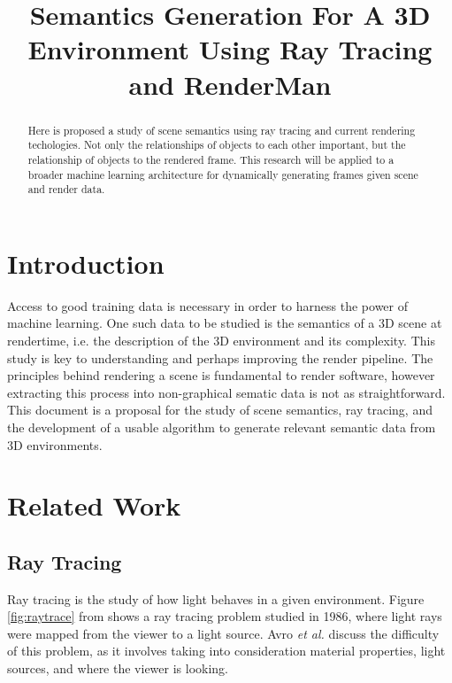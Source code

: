 \documentclass[conference]{IEEEtran}
\begin{document}
\title{Semantics Generation For A 3D Environment Using Ray Tracing and RenderMan}

\author{
}

\maketitle

\begin{abstract}

Here is proposed a study of scene semantics
using ray tracing and current rendering techologies.
Not only the relationships of objects to each other important,
but the relationship of objects to the rendered frame.
This research will be applied to a broader machine learning
architecture for dynamically generating frames
given scene and render data.
\end{abstract}

\section{Introduction}
\label{sec:introduction}
Access to good training data is necessary
in order to harness the power of machine learning.
One such data to be studied is the semantics of a 3D scene at rendertime,
i.e. the description of the 3D environment and its complexity.
This study is key to understanding and perhaps improving the render
pipeline.
The principles behind rendering a scene is fundamental to
render software, however
extracting this process into non-graphical sematic data is not as straightforward.
This document is a proposal for the study of scene semantics, ray tracing, and the development of a
usable algorithm to generate relevant semantic data from 3D environments.

\section{Related Work}
\label{sec:related_work}

\subsection{Ray Tracing}
Ray tracing is the study of how light behaves in a given environment.
Figure \ref{fig:raytrace} from \cite{backwards_raytrace}
shows a ray tracing problem studied in 1986, where light rays were mapped from
the viewer to a light source. Avro \textit{et al.}
\cite{backwards_raytrace} discuss the difficulty of this problem,
as it involves taking into consideration material properties, light sources,
and where the viewer is looking.
\end{document}

